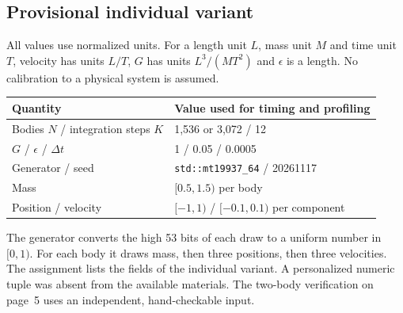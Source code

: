 \documentclass[11pt,a4paper]{article}
\newcommand{\subtopic}[1]{\subsection*{#1}}
\begin{document}
\subtopic{Provisional individual variant}
All values use normalized units. For a length unit $L$, mass unit $M$ and
time unit $T$, velocity has units $L/T$, $G$ has units $L^3/(MT^2)$ and
$\epsilon$ is a length. No calibration to a physical system is assumed.
\begin{center}\renewcommand{\arraystretch}{1.12}
\begin{tabular}{@{}ll@{}}\toprule
Quantity & Value used for timing and profiling \\\midrule
Bodies $N$ / integration steps $K$ & 1,536 or 3,072 / 12 \\
$G$ / $\epsilon$ / $\Delta t$ & 1 / 0.05 / 0.0005 \\
Generator / seed & \texttt{std::mt19937\_64} / 20261117 \\
Mass & $[0.5,1.5)$ per body \\
Position / velocity & $[-1,1)$ / $[-0.1,0.1)$ per component \\\bottomrule
\end{tabular}\end{center}
The generator converts the high 53 bits of each draw to a uniform number in
$[0,1)$. For each body it draws mass, then three positions, then three
velocities. The assignment lists the fields of the individual variant. A
personalized numeric tuple was absent from the available materials. The
two-body verification on page~5 uses an independent, hand-checkable input.
\end{document}
